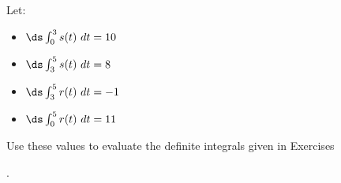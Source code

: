 {\noindent Let:
\begin{itemize}
\item $\ds \int_0^3 s(t)\ dt = 10$
\item $\ds \int_3^5 s(t) \ dt=8$
\item $\ds \int_3^5 r(t)\ dt = -1$
\item $\ds \int_0^5 r(t)\ dt = 11$
\end{itemize}
Use these values to evaluate the definite integrals given in Exercises}
{.}
